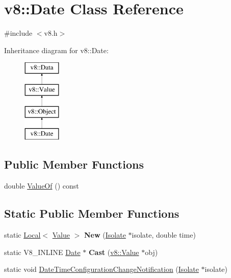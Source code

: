 \hypertarget{classv8_1_1_date}{}\section{v8\+:\+:Date Class Reference}
\label{classv8_1_1_date}


{\ttfamily \#include $<$v8.\+h$>$}

Inheritance diagram for v8\+:\+:Date\+:\begin{figure}[H]
\begin{center}
\leavevmode
\includegraphics[height=4.000000cm]{classv8_1_1_date}
\end{center}
\end{figure}
\subsection*{Public Member Functions}
\begin{DoxyCompactItemize}
\item 
double \hyperlink{classv8_1_1_date_a06800409271fe5fa74202e0fd1ec8e87}{Value\+Of} () const 
\end{DoxyCompactItemize}
\subsection*{Static Public Member Functions}
\begin{DoxyCompactItemize}
\item 
\hypertarget{classv8_1_1_date_a5f93eb196aa81f4564a8903aeb88cabb}{}static \hyperlink{classv8_1_1_local}{Local}$<$ \hyperlink{classv8_1_1_value}{Value} $>$ {\bfseries New} (\hyperlink{classv8_1_1_isolate}{Isolate} $\ast$isolate, double time)\label{classv8_1_1_date_a5f93eb196aa81f4564a8903aeb88cabb}

\item 
\hypertarget{classv8_1_1_date_a8e5ea7c1f28924b82922270d6596b4d3}{}static V8\+\_\+\+I\+N\+L\+I\+N\+E \hyperlink{classv8_1_1_date}{Date} $\ast$ {\bfseries Cast} (\hyperlink{classv8_1_1_value}{v8\+::\+Value} $\ast$obj)\label{classv8_1_1_date_a8e5ea7c1f28924b82922270d6596b4d3}

\item 
static void \hyperlink{classv8_1_1_date_adb084ec0683d3d195ad0f78af5f6f72b}{Date\+Time\+Configuration\+Change\+Notification} (\hyperlink{classv8_1_1_isolate}{Isolate} $\ast$isolate)
\end{DoxyCompactItemize}
